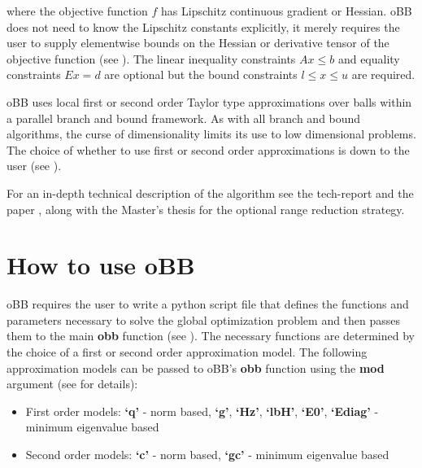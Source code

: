 \documentclass[letterpaper,11pt,openany,oneside]{sphinxmanual}
\begin{document}
where the objective function \(f\) has Lipschitz continuous gradient or Hessian. oBB does not need to know the Lipschitz constants explicitly, it merely requires the user to supply elementwise bounds on the Hessian or derivative tensor of the objective function (see {\hyperref[userguide:how\string-to\string-use\string-obb]{}}). The linear inequality constraints \(Ax \le b\) and equality constraints \(Ex = d\) are optional but the bound constraints \(l \le x \le u\) are required.

oBB uses local first or second order Taylor type approximations over balls within a parallel branch and bound framework. As with all branch and bound algorithms, the curse of dimensionality limits its use to low dimensional problems. The choice of whether to use first or second order approximations is down to the user  (see {\hyperref[userguide:how\string-to\string-use\string-obb]{}}).

For an in-depth technical description of the algorithm see the tech-report \label{userguide:id1}{\hyperref[userguide:cfg2013]{\crossref{{[}CFG2013{]}}}} and the paper \label{userguide:id2}{\hyperref[userguide:fgf2013]{\crossref{{[}FGF2013{]}}}}, along with the Master's thesis \label{userguide:id3}{\hyperref[userguide:g2015]{\crossref{{[}G2015{]}}}} for the optional range reduction strategy.


\section{How to use oBB}
\label{userguide:how-to-use-obb}
oBB requires the user to write a python script file that defines the functions and parameters necessary to solve the global optimization problem and then passes them to the main \textbf{obb} function (see {\hyperref[userguide:example\string-of\string-use]{}}). The necessary functions are determined by the choice of a first or second order approximation model. The following approximation models can be passed to oBB's \textbf{obb} function using the \textbf{mod} argument (see \label{userguide:id4}{\hyperref[userguide:cfg2013]{\crossref{{[}CFG2013{]}}}} for details):
\begin{itemize}
\item {} 
First order models: \textbf{`q'} - norm based,  \textbf{`g'}, \textbf{`Hz'}, \textbf{`lbH'}, \textbf{`E0'}, \textbf{`Ediag'} - minimum eigenvalue based

\item {} 
Second order models: \textbf{`c'} - norm based, \textbf{`gc'} - minimum eigenvalue based

\end{itemize}
\end{document}
